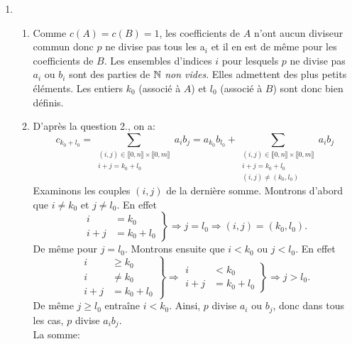 \begin{enumerate}
\item 
\begin{enumerate}
   \item Comme $c(A)=c(B)=1$, les coefficients de $A$ n'ont aucun diviseur commun donc $p$ ne divise pas tous les a$_i$ et il en est de même pour les coefficients de $B$. Les ensembles d'indices $i$ pour lesquels $p$ ne divise pas $a_i$ ou $b_i$ sont des parties de $\mathbb{N}$ \emph{non vides}. Elles admettent des plus petits éléments. Les entiers $k_{0}$ (associé à $A$) et $l_{0}$ (associé à $B$) sont donc bien définis. 
   \item D'après la question 2., on a:
\[
c_{k_{0}+l_{0}} = \sum_{\substack{(i,j)\in \llbracket 0, n\rrbracket \times \llbracket 0, m\rrbracket \\ i+j = k_{0} + l_{0}}} a_{i}b_{j} 
     = a_{k_{0}}b_{l_{0}} 
  +\sum_{\substack{(i,j)\in \llbracket 0, n\rrbracket \times \llbracket 0, m\rrbracket \\ i + j = k_{0}+l_{0}\\ (i,j)\neq (k_{0},l_{0})}} a_{i}b_{j}  
\]
Examinons les couples $(i,j)$ de la dernière somme.\newline
Montrons d'abord que $i\neq k_{0}$ et $j\neq l_{0}$. En effet
\begin{displaymath}
\left. 
\begin{aligned}
  i &= k_{0} \\ i+j &= k_{0} + l_{0}  
\end{aligned}
\right\rbrace \Rightarrow j = l_{0} \Rightarrow (i,j) = (k_{0}, l_{0}).
\end{displaymath}
De même pour $j=l_{0}$. 
Montrons ensuite que $i < k_{0}$ ou $j<l_{0}$. En effet 
\begin{displaymath}
\left. 
\begin{aligned}
i&\geq k_{0} \\ i&\neq k_{0} \\ i +j &= k_0 + l_0 
\end{aligned}
\right\rbrace \Rightarrow
\left. 
\begin{aligned}
i&< k_{0} \\ i +j &= k_0 + l_0 
\end{aligned}
\right\rbrace \Rightarrow j > l_0  .
\end{displaymath}
De même  $j\geq l_{0}$ entraîne $i < k_{0}$. \newline
Ainsi, $p$ divise $a_{i}$ ou $b_{j}$, donc dans tous les cas, $p$ divise $a_{i}b_{j}$. \\        
La somme:
\begin{displaymath}

\end{displaymath}
\end{enumerate}
\end{enumerate}

